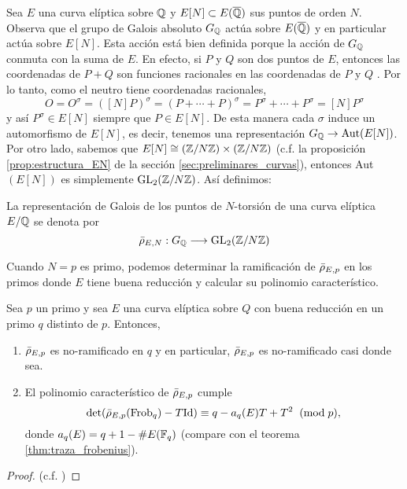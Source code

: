 Sea $E$ una curva el\'iptica sobre $\mathbb{Q}$ y $E[N]\subset E(\overline{\mathbb{Q}})$ sus puntos de orden $N$. Observa que el grupo de Galois absoluto $G_{\mathbb{Q}}$ act\'ua sobre $E(\overline{\mathbb{Q}})$ y en particular act\'ua sobre $E[N]$. Esta acci\'on est\'a bien definida porque la acci\'on de $G_{\mathbb{Q}}$ conmuta con la suma de $E$. En efecto, si $P$ y $Q$ son dos puntos de $E$, entonces las coordenadas de $P+Q$ son funciones racionales en las coordenadas de $P$ y $Q$ \cite[\S III.2, Group Law Algorithm]{SilvermanTAOEC}. Por lo tanto, como el neutro tiene coordenadas racionales,
\[
  O=O^{\sigma}=([N]P)^{\sigma}=(P+\cdots+P)^{\sigma}=
  P^{\sigma}+\cdots+P^{\sigma}=[N]P^{\sigma}
\]
y as\'i $P^{\sigma}\in E[N]$ siempre que $P\in E[N]$. De esta manera cada $\sigma$ induce un automorfismo de $E[N]$, es decir, tenemos una representaci\'on $G_{\mathbb{Q}}\rightarrow\text{Aut}(E[N])$. Por otro lado, sabemos que $E[N]\cong(\mathbb{Z}/N\mathbb{Z})\times(\mathbb{Z}/N\mathbb{Z})$  (c.f. la proposici\'on \ref{prop:estructura_EN} de la secci\'on \ref{sec:preliminares_curvas}), entonces Aut$(E[N])$ es simplemente $\mathrm{GL}_2(\mathbb{Z}/N\mathbb{Z})$. As\'i definimos:

\begin{defin}\label{def:rep-galois-N-torsion}
  La representaci\'on de Galois de los puntos de $N$-torsi\'on de una curva el\'iptica $E/\mathbb{Q}$  se denota por
  \[
    \bar{\rho}_{E,N}:G_{\mathbb{Q}}\longrightarrow \mathrm{GL}_2(\mathbb{Z}/N\mathbb{Z})
  \]
\end{defin}

Cuando $N=p$ es primo, podemos determinar la ramificaci\'on de $\bar{\rho}_{E,p}$ en los primos donde $E$ tiene buena reducci\'on y calcular su polinomio caracter\'istico.

\begin{prop}\label{prop:prop_de_rhop}
  Sea $p$ un primo y sea $E$ una curva el\'iptica sobre $Q$ con buena reducci\'on en un primo $q$ distinto de $p$. Entonces,
  \begin{enumerate}[label=\roman*)]
  \item $\bar{\rho}_{E,p}$ es no-ramificado en $q$ y en particular, $\bar{\rho}_{E,p}$ es no-ramificado casi donde sea.
  \item El polinomio caracter\'istico de $\bar{\rho}_{E,p}$ cumple
    \[
      \det(\bar{\rho}_{E,p}(\mathrm{Frob}_q)-T\mathrm{Id})\equiv q-a_{q}(E)T+T^2 \;\;(\mathrm{mod}\; p),
    \]
    donde $a_q(E)=q+1-\# E(\mathbb{F}_q)$ (compare con el teorema \ref{thm:traza_frobenius}).
  \end{enumerate}
\end{prop}
\begin{proof}
  (c.f. \cite[\S3.3, proposici\'on 3.15]{SaitoFLTBT})
\end{proof}

